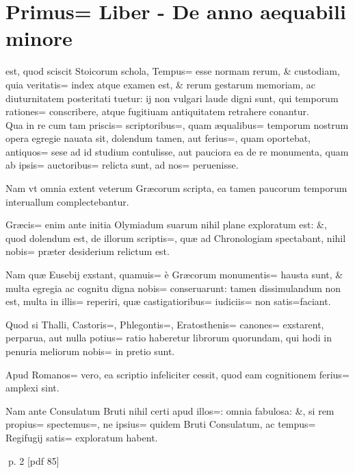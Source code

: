 \chapter{Primus= Liber - De anno aequabili minore}

 \begin{parnumbers}
est, quod sciscit Stoicorum schola, Tempus= esse normam rerum, \& custodiam, quia veritatis= index atque examen est, \& rerum gestarum memoriam, ac diuturnitatem posteritati tuetur: ij non vulgari laude digni sunt, qui temporum rationes= conscribere, atque fugitiuam antiquitatem retrahere conantur.
\\ \p
Qua in re cum tam priscis= scriptoribus=, quam æqualibus= temporum nostrum opera egregie nauata sit, dolendum tamen, aut
ferius=, quam oportebat, antiquos= sese ad id studium contulisse, aut pauciora ea de re monumenta, quam ab ipsis= auctoribus= relicta sunt, ad nos= peruenisse.

Nam vt omnia extent veterum Græcorum scripta, ea tamen paucorum temporum interuallum complectebantur.

Græcis= enim ante initia Olymiadum suarum nihil plane exploratum est: \&, quod dolendum est, de illorum scriptis=, quæ ad Chronologiam spectabant, nihil nobis= præter desiderium relictum est.

Nam quæ Eusebij exstant, quamuis= è Græcorum monumentis= hausta sunt, \& multa egregia ac cognitu digna nobis= conseruarunt: tamen dissimulandum non est, multa in illis= reperiri, quæ castigatioribus= iudiciis= non satis=faciant.

Quod si Thalli, Castoris=, Phlegontis=, Eratosthenis= canones= exstarent, perparua, aut nulla potius= ratio haberetur librorum quorundam, qui hodi in penuria meliorum nobis= in pretio sunt.

Apud Romanos= vero, ea scriptio infeliciter cessit, quod eam cognitionem ferius= amplexi sint.

Nam ante Consulatum Bruti nihil certi apud illos=: omnia fabulosa: \&, si rem propius= spectemus=, ne ipsius= quidem Bruti Consulatum, ac tempus= Regifugij satis= exploratum habent.

\end{parnumbers}
\clearpage
p. 2 [pdf 85]

